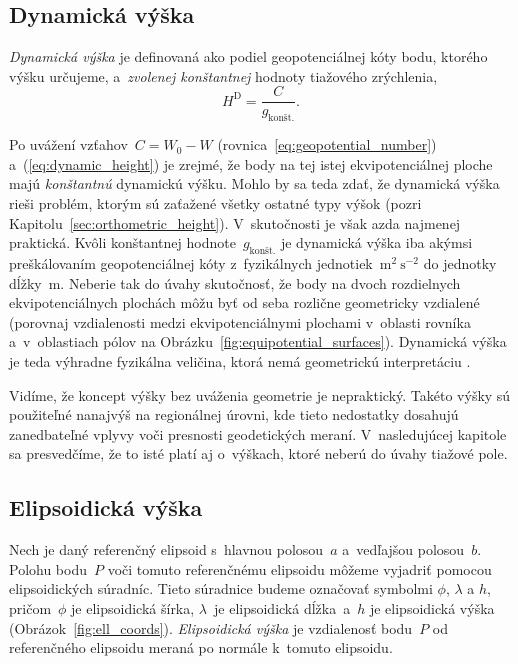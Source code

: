 \documentclass[a4paper, 12pt]{book}
\begin{document}
\subsection{Dynamická výška}
\label{sec:dynamic_height}

\emph{Dynamická výška} je definovaná ako podiel geopotenciálnej kóty bodu, 
ktorého výšku určujeme, a~\emph{zvolenej konštantnej} hodnoty tiažového 
zrýchlenia,
%
\begin{equation}
\label{eq:dynamic_height}
H^\mathrm{D} = \frac{C}{g_\textrm{kon\v{s}t.}}{.}
\end{equation}

Po uvážení vzťahov~$C = W_0 - W$ (rovnica~\ref{eq:geopotential_number}) 
a~(\ref{eq:dynamic_height}) je zrejmé, že body na tej istej ekvipotenciálnej 
ploche majú \emph{konštantnú} dynamickú výšku.  Mohlo by sa teda zdať, že 
dynamická výška rieši problém, ktorým sú zaťažené všetky ostatné typy výšok 
(pozri Kapitolu~\ref{sec:orthometric_height}).  V~skutočnosti je však azda 
najmenej praktická.  Kvôli konštantnej hodnote~$g_{\textrm{konšt.}}$ je 
dynamická výška iba akýmsi preškálovaním geopotenciálnej kóty z~fyzikálnych 
jednotiek~$\mathrm{m}^2 \ \mathrm{s}^{-2}$ do jednotky dĺžky~$\mathrm{m}$.  
Neberie tak do úvahy skutočnosť, že body na dvoch rozdielnych ekvipotenciálnych 
plochách môžu byť od seba rozlične geometricky vzdialené (porovnaj vzdialenosti 
medzi ekvipotenciálnymi plochami v~oblasti rovníka a~v~oblastiach pólov na 
Obrázku~\ref{fig:equipotential_surfaces}).  Dynamická výška je teda výhradne 
fyzikálna veličina, ktorá nemá geometrickú interpretáciu 
\parencite{Jekeli2000a}.

Vidíme, že koncept výšky bez uváženia geometrie je nepraktický.  Takéto výšky 
sú použiteľné nanajvýš na regionálnej úrovni, kde tieto nedostatky dosahujú 
zanedbateľné vplyvy voči presnosti geodetických meraní.  V~nasledujúcej 
kapitole sa presvedčíme, že to isté platí aj o~výškach, ktoré neberú do úvahy 
tiažové pole.

\subsection{Elipsoidická výška}
\label{sec:ellipsoidal_height}

Nech je daný referenčný elipsoid s~hlavnou polosou~$a$ a~vedľajšou polosou~$b$.  
Polohu bodu~$P$ voči tomuto referenčnému elipsoidu môžeme vyjadriť pomocou 
elipsoidických súradníc.  Tieto súradnice budeme označovať symbolmi $\phi$, 
$\lambda$ a $h$, pričom~$\phi$ je elipsoidická šírka, $\lambda$~je elipsoidická 
dĺžka~a~$h$ je elipsoidická výška (Obrázok~\ref{fig:ell_coords}).  
\emph{Elipsoidická výška} je vzdialenosť bodu~$P$ od referenčného elipsoidu 
meraná po normále k~tomuto elipsoidu.
\end{document}
